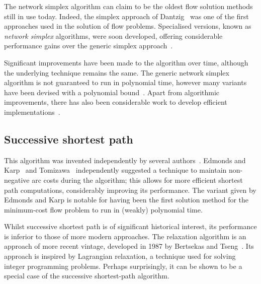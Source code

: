 The network simplex algorithm can claim to be the oldest flow solution methods still in use today. Indeed, the simplex approach of Dantzig~\cite{Dantzig:1949} was one of the first approaches used in the solution of flow problems. Specialised versions, known as \emph{network simplex} algorithms, were soon developed, offering considerable performance gains over the generic simplex approach~\cite{Dantzig:1962}.

Significant improvements have been made to the algorithm over time, although the underlying technique remains the same. The generic network simplex algorithm is not guaranteed to run in polynomial time\footnotemark, however many variants have been devised with a polynomial bound~\cite{Tarjan:1991,Goldfarb:1992}. Apart from algorithmic improvements, there has also been considerable work to develop efficient implementations~\cite{Lobel:1996,Grigoriadis:1986}.

\subsection{Successive shortest path} \label{sec:intro-related-work-ssp}

This algorithm was invented independently by several authors~\cite{Jewell:1958,Iri:1960,BusackerGowen:1960}. Edmonds and Karp~\cite{Edmonds:1972} and Tomizawa~\cite{Tomizawa:1971} independently suggested a technique to maintain non-negative arc costs during the algorithm; this allows for more efficient shortest path computations, considerably improving its performance. The variant given by Edmonds and Karp is notable for having been the first solution method for the minimum-cost flow problem to run in (weakly) polynomial time\footnotemark.


Whilst successive shortest path is of significant historical interest, its performance is inferior to those of more modern approaches. The relaxation algorithm is an approach of more recent vintage, developed in 1987 by Bertsekas and Tseng~\cite{BertsekasMethod:1988,BertsekasCodes:1988,BertsekasTseng:94}. Its approach is inspired by Lagrangian relaxation, a technique used for solving integer programming problems. Perhaps surprisingly, it can be shown to be a special case of the successive shortest-path algorithm.

